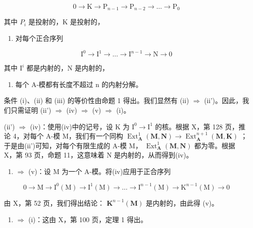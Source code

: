 \[
0 \rightarrow \mathrm{K} \rightarrow \mathrm{P} _ {n - 1} \rightarrow \mathrm{P} _ {n - 2} \rightarrow \dots \rightarrow \mathrm{P} _ {0}
\]

其中 \(P_{i}\) 是投射的，K 是投射的，

\begin{enumerate}
\def\labelenumi{(\roman{enumi})}
\setcounter{enumi}{3}
\tightlist
\item
  对每个正合序列
\end{enumerate}

\[
\mathrm{I} ^ {0} \rightarrow \mathrm{I} ^ {1} \rightarrow \dots \rightarrow \mathrm{I} ^ {n - 1} \rightarrow \mathrm{N} \rightarrow 0
\]

其中 \(\mathrm{I}^{i}\) 都是内射的，N 是内射的，

\begin{enumerate}
\def\labelenumi{(\alph{enumi})}
\setcounter{enumi}{21}
\tightlist
\item
  每个 A-模都有长度不超过 n 的内射分解。
\end{enumerate}

条件 (i)、(ii) 和 (iii) 的等价性由命题 1 得出。我们显然有 (ii) \(\Rightarrow\) (ii')。因此，我们只需证明 (ii') \(\Rightarrow\) (iv) \(\Rightarrow\) (v) \(\Rightarrow\) (i)。

(ii') \(\Rightarrow\) (iv)：使用(iv)中的记号，设 K 为 \(\mathrm{I}^{0} \to \mathrm{I}^{1}\) 的核。根据 X，第 128 页，推论 4，对每个 A-模 M，我们有一个同构 \(\operatorname{Ext}_{\mathbf{A}}^{1}(\mathbf{M}, \mathbf{N}) \to \operatorname{Ext}_{\mathbf{A}}^{n+1}(\mathbf{M}, \mathbf{K})\) ；于是由(ii')可知，对每个有限生成的 A-模 M， \(\operatorname{Ext}_{\mathbf{A}}^{1}(\mathbf{M}, \mathbf{N})\) 都为零。根据 X，第 93 页，命题 11，这意味着 N 是内射的，从而得到(iv)。

\begin{enumerate}
\def\labelenumi{(\roman{enumi})}
\setcounter{enumi}{3}
\tightlist
\item
  \(\Rightarrow\) (v)：设 M 为一个 A-模。将(iv)应用于正合序列
\end{enumerate}

\[
0 \rightarrow \mathrm{M} \rightarrow \mathrm{I} ^ {0} (\mathrm{M}) \rightarrow \mathrm{I} ^ {1} (\mathrm{M}) \rightarrow \dots \rightarrow \mathrm{I} ^ {n - 1} (\mathrm{M}) \rightarrow \mathrm{K} ^ {n - 1} (\mathrm{M}) \rightarrow 0
\]

由 X，第 52 页，我们得出结论： \(\mathbf{K}^{n-1}(\mathbf{M})\) 是内射的，由此得 (v)。

\begin{enumerate}
\def\labelenumi{(\alph{enumi})}
\setcounter{enumi}{21}
\tightlist
\item
  \(\Rightarrow\) (i)：这由 X，第 100 页，定理 1 得出。
\end{enumerate}

